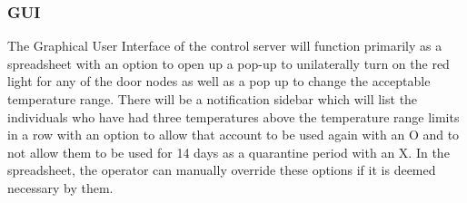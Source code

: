 \subsubsection{GUI}
The Graphical User Interface of the control server will function primarily as a
spreadsheet with an option to open up a pop-up to unilaterally turn on the red
light for any of the door nodes as well as a pop up to change the acceptable
temperature range. There will be a notification sidebar which will list the
individuals who have had three temperatures above the temperature range limits
in a row with an option to allow that account to be used again with an O and to not
allow them to be used for 14 days as a quarantine period with an X. In the
spreadsheet, the operator can manually override these options if it is deemed
necessary by them.
